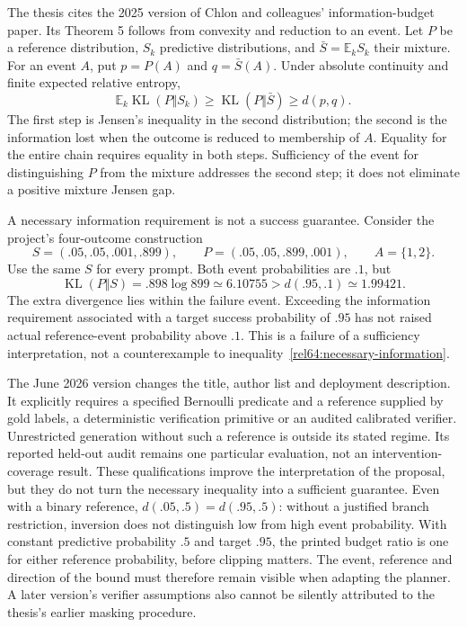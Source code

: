The thesis cites the 2025 version of Chlon and colleagues' information-budget
paper. Its Theorem 5 follows from convexity and reduction to an event. Let
$P$ be a reference distribution, $S_k$ predictive distributions, and
$\bar S=\mathbb E_k S_k$ their mixture. For an event $A$, put
$p=P(A)$ and $q=\bar S(A)$. Under absolute continuity and finite expected
relative entropy,
\begin{equation}
 \mathbb E_k\operatorname{KL}(P\Vert S_k)
 \geq\operatorname{KL}(P\Vert\bar S)
 \geq d(p,q).
 \label{rel64:necessary-information}
\end{equation}
The first step is Jensen's inequality in the second distribution; the second
is the information lost when the outcome is reduced to membership of $A$.
Equality for the entire chain requires equality in both steps. Sufficiency
of the event for distinguishing $P$ from the mixture addresses the second
step; it does not eliminate a positive mixture Jensen gap.
\citep{rel64chlonone,rel64chlonthree}

A necessary information requirement is not a success guarantee. Consider the
project's four-outcome construction
\[
 S=(.05,.05,.001,.899),\qquad
 P=(.05,.05,.899,.001),\qquad A=\{1,2\}.
\]
Use the same $S$ for every prompt. Both event probabilities are $.1$, but
\[
 \operatorname{KL}(P\Vert S)=.898\log899\simeq6.10755
 >d(.95,.1)\simeq1.99421.
\]
The extra divergence lies within the failure event. Exceeding the information
requirement associated with a target success probability of $.95$ has not
raised actual reference-event probability above $.1$. This is a failure of a
sufficiency interpretation, not a counterexample to
inequality~\eqref{rel64:necessary-information}.

The June 2026 version changes the title, author list and deployment
description. It explicitly requires a specified Bernoulli predicate and a
reference supplied by gold labels, a deterministic verification primitive or
an audited calibrated verifier. Unrestricted generation without such a
reference is outside its stated regime. Its reported held-out audit remains
one particular evaluation, not an intervention-coverage result. These
qualifications improve the interpretation of the proposal, but they do not
turn the necessary inequality into a sufficient guarantee. Even with a
binary reference, $d(.05,.5)=d(.95,.5)$: without a justified branch
restriction, inversion does not distinguish low from high event probability.
With constant predictive probability $.5$ and target $.95$, the printed
budget ratio is one for either reference probability, before clipping matters.
The event, reference and direction of the bound must therefore remain visible
when adapting the planner. A later version's verifier assumptions also cannot
be silently attributed to the thesis's earlier masking procedure.
\citep{rel64chlonthree}

